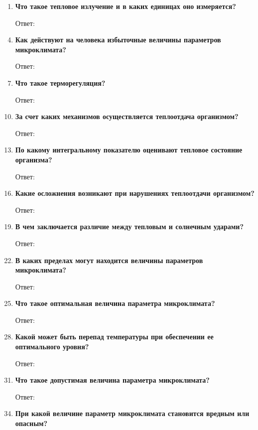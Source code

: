 \documentclass[a5paper, 12dd, twoside]{article}
\begin{document}
\begin{enumerate}
    \item {\bfseries Что такое тепловое излучение и в каких единицах оно измеряется?}
    \item [Ответ:]
    \item []
    \item {\bfseries Как действуют на человека избыточные величины параметров микроклимата?}
    \item [Ответ:]
    \item []
    \item {\bfseries Что такое терморегуляция?}
    \item [Ответ:]
    \item []
    \item {\bfseries За счет каких механизмов осуществляется теплоотдача организмом?}
    \item [Ответ:]
    \item []
    \item {\bfseries По какому интегральному показателю оценивают тепловое состояние организма?}
    \item [Ответ:]
    \item []
    \item {\bfseries Какие осложнения возникают при нарушениях теплоотдачи организмом?}
    \item [Ответ:]
    \item []
    \item {\bfseries В чем заключается различие между тепловым и солнечным ударами?}
    \item [Ответ:]
    \item []
    \item {\bfseries В каких пределах могут находится величины параметров микроклимата?}
    \item [Ответ:]
    \item []
    \item {\bfseries Что такое оптимальная величина параметра микроклимата?}
    \item [Ответ:]
    \item []
    \item {\bfseries Какой может быть перепад температуры при обеспечении ее оптимального уровня?}
    \item [Ответ:]
    \item []
    \item {\bfseries Что такое допустимая величина параметра микроклимата?}
    \item [Ответ:]
    \item []
    \item {\bfseries При какой величине параметр микроклимата становится вредным или опасным?}

\end{enumerate}
\end{document}
